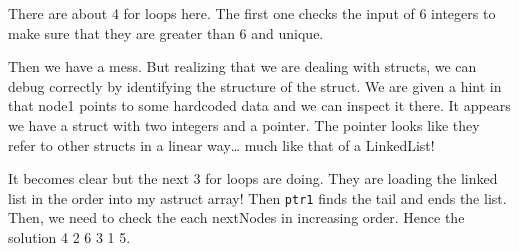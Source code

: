 \documentclass[11pt]{article}
\begin{document}
There are about 4 for loops here. The first one checks the input of 6
integers to make sure
that they are greater than 6 and unique.

Then we have a mess. But realizing that we are dealing with structs, we can
debug correctly by identifying the structure of the struct. We are given a
hint in that node1 points to some hardcoded data and we can inspect it there.
It appears we have a struct with two integers and a pointer. The pointer
looks like they refer to other structs in a linear way\ldots{} much like that of a
LinkedList! 

It becomes clear but the next 3 for loops are doing. They are loading the
linked list in the order into my astruct array! Then \texttt{ptr1} finds the tail
and ends the list. Then, we need to check the each nextNodes in increasing
order. Hence the solution 4 2 6 3 1 5.  
\end{document}
